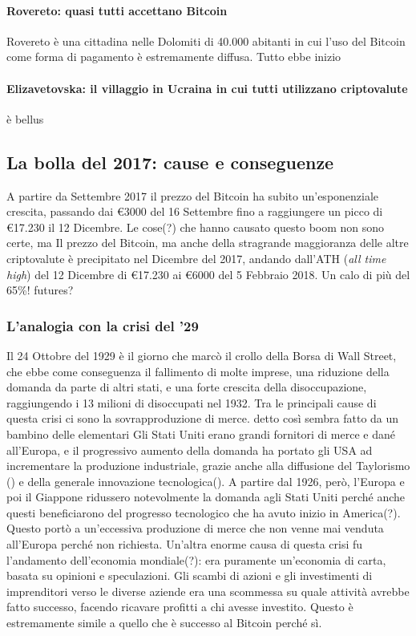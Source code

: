 \documentclass {article}
\begin{document}
{\paragraph {Rovereto: quasi tutti accettano Bitcoin}


Rovereto è una cittadina nelle Dolomiti di 40.000 abitanti in cui l'uso del Bitcoin come forma di pagamento è estremamente diffusa.
Tutto ebbe inizio


\paragraph {Elizavetovska: il villaggio in Ucraina in cui tutti utilizzano criptovalute}


è bellus


\subsection {La bolla del 2017: cause e conseguenze}


A partire da Settembre 2017 il prezzo del Bitcoin ha subito un'esponenziale crescita, passando dai \euro{3000} del 16 Settembre fino a raggiungere un picco di \euro{17.230} il 12 Dicembre.
Le cose(?) che hanno causato questo boom non sono certe, ma
Il prezzo del Bitcoin, ma anche della stragrande maggioranza delle altre criptovalute è precipitato nel Dicembre del 2017, andando dall'ATH (\textit{all time high}) del 12 Dicembre di \euro{17.230} ai \euro{6000} del 5 Febbraio 2018. Un calo di più del 65\%!
futures?


\subsubsection {L'analogia con la crisi del '29}


Il 24 Ottobre del 1929 è il giorno che marcò il crollo della Borsa di Wall Street, che ebbe come conseguenza il fallimento di molte imprese, una riduzione della domanda da parte di altri stati, e una forte crescita della disoccupazione, raggiungendo i 13 milioni di disoccupati nel 1932.
Tra le principali cause di questa crisi ci sono la sovrapproduzione di merce. detto così sembra fatto da un bambino delle elementari
Gli Stati Uniti erano grandi fornitori di merce e dané all'Europa, e il progressivo aumento della domanda ha portato gli USA ad incrementare la produzione industriale, grazie anche alla diffusione del Taylorismo () e della generale innovazione tecnologica().
A partire dal 1926, però, l'Europa e poi il Giappone ridussero notevolmente la domanda agli Stati Uniti perché anche questi beneficiarono del progresso tecnologico che ha avuto inizio in America(?).
Questo portò a un'eccessiva produzione di merce che non venne mai venduta all'Europa perché non richiesta.
Un'altra enorme causa di questa crisi fu l'andamento dell'economia mondiale(?): era puramente un'economia di carta, basata su opinioni e speculazioni.
Gli scambi di azioni e gli investimenti di imprenditori verso le diverse aziende era una scommessa su quale attività avrebbe fatto successo, facendo ricavare profitti a chi avesse investito.
Questo è estremamente simile a quello che è successo al Bitcoin perché sì.


}
\end{document}
